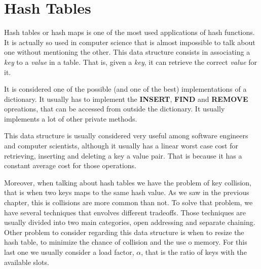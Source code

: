 \chapter{Hash Tables}
\label{cap:Hash Tables}



Hash tables or hash maps is one of the most used applications of hash functions. It is actually so used in computer science that is almost impossible to talk about one without mentioning the other. This data structure consists in associating a \textit{key} to a \textit{value} in a table. That is, given a \textit{key}, it can retrieve the correct \textit{value} for it.

It is considered one of the possible (and one of the best) implementations of a dictionary. It usually has to implement the \textbf{INSERT}, \textbf{FIND} and \textbf{REMOVE} opreations, that can be accessed from outside the dictionary. It usually implements a lot of other private methods. 

This data structure is usually considered very useful among software engineers and computer scientists, although it usually has a linear worst case cost for retrieving, inserting and deleting a key a value pair. That is because it has a constant average cost for those operations.

Moreover, when talking about hash tables we have the problem of key collision, that is when two keys maps to the same hash value. As we saw in the previous chapter, this is collisions are more common than not. To solve that problem, we have several techniques that envolves different tradeoffs. Those techniques are usually divided into two main categories, open addressing and separate chaining. Other problem to consider regarding this data structure is when to resize the hash table, to minimize the chance of collision and the use o memory. For this last one we usually consider a load factor, \( \alpha \), that is the ratio of keys with the available slots.


